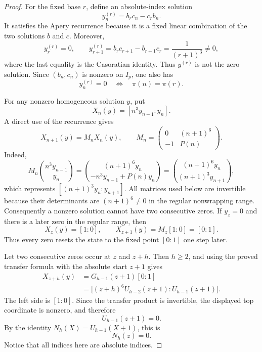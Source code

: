 \begin{proof}
For the fixed base $r$, define an absolute-index solution
\[
 y^{(r)}_n=b_r c_n-c_r b_n.
\]
It satisfies the Apery recurrence because it is a fixed linear
combination of the two solutions $b$ and $c$.  Moreover,
\[
 y^{(r)}_r=0,
 \qquad
 y^{(r)}_{r+1}
 =b_r c_{r+1}-b_{r+1}c_r
 =\frac1{(r+1)^3}\neq0,
\]
where the last equality is the Casoratian identity.  Thus
$y^{(r)}$ is not the zero solution.  Since $(b_n,c_n)$ is nonzero on
$I_p$, one also has
\begin{equation}
 y^{(r)}_n=0
 \quad\Longleftrightarrow\quad
 \pi(n)=\pi(r).
 \label{eq:br-return-zero}
\end{equation}

For any nonzero homogeneous solution $y$, put
\[
 X_n(y)=[n^3y_{n-1}:y_n].
\]
A direct use of the recurrence gives
\begin{equation}
 X_{n+1}(y)=M_nX_n(y),
 \qquad
 M_n=
 \begin{pmatrix}
 0&(n+1)^6\\
 -1&P(n)
 \end{pmatrix}.
 \label{eq:br-state-transfer}
\end{equation}
Indeed,
\[
 M_n
 \binom{n^3y_{n-1}}{y_n}
 =
 \binom{(n+1)^6y_n}{-n^3y_{n-1}+P(n)y_n}
 =
 \binom{(n+1)^6y_n}{(n+1)^3y_{n+1}},
\]
which represents $[(n+1)^3y_n:y_{n+1}]$.
All matrices used below are invertible because their determinants are
$(n+1)^6\neq0$ in the regular nonwrapping range.  Consequently a
nonzero solution cannot have two consecutive zeros.  If $y_z=0$ and
there is a later zero in the regular range, then
\[
 X_z(y)=[1:0],
 \qquad
 X_{z+1}(y)=M_z[1:0]=[0:1].
\]
Thus every zero resets the state to the fixed point $[0:1]$ one step
later.

Let two consecutive zeros occur at $z$ and $z+h$.  Then $h\geq2$, and
using the proved transfer formula with the absolute start $z+1$ gives
\begin{align*}
 X_{z+h}(y)
 &=G_{h-1}(z+1)[0:1]\\
 &=\bigl[(z+h)^6U_{h-2}(z+1):U_{h-1}(z+1)\bigr].
\end{align*}
The left side is $[1:0]$.  Since the transfer product is invertible,
the displayed top coordinate is nonzero, and therefore
\begin{equation}
 U_{h-1}(z+1)=0.
 \label{eq:br-U-gap}
\end{equation}
By the identity $N_h(X)=U_{h-1}(X+1)$, this is
\begin{equation}
 N_h(z)=0.
 \label{eq:br-N-gap}
\end{equation}
Notice that all indices here are absolute indices.


\end{proof}
